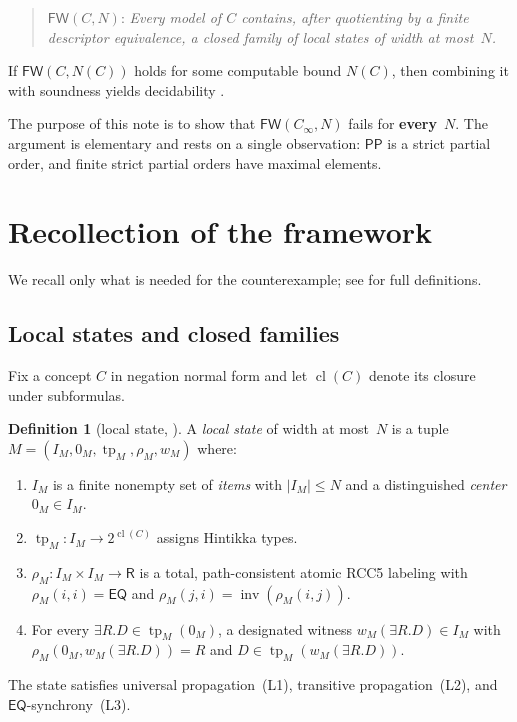 \documentclass[11pt]{article}
\theoremstyle{definition}
\newtheorem{definition}[theorem]{Definition}
\newcommand{\cl}{\operatorname{cl}}
\newcommand{\tp}{\operatorname{tp}}
\newcommand{\Roles}{\mathsf{R}}
\newcommand{\Eq}{\mathsf{EQ}}
\newcommand{\Pp}{\mathsf{PP}}
\newcommand{\inv}{\operatorname{inv}}
\begin{document}
\begin{quote}
$\mathsf{FW}(C,N)$: \emph{Every model of $C$ contains, after
quotienting by a finite descriptor equivalence, a closed family of
local states of width at most~$N$.}
\end{quote}

If $\mathsf{FW}(C,N(C))$ holds for some computable bound $N(C)$, then
combining it with soundness yields decidability \cite[Proposition~7.1]{GPT2026}.

\medskip
The purpose of this note is to show that $\mathsf{FW}(C_\infty,N)$
fails for \textbf{every}~$N$.  The argument is elementary and rests on
a single observation: $\Pp$ is a strict partial order, and finite
strict partial orders have maximal elements.

\section{Recollection of the framework}\label{sec:recap}

We recall only what is needed for the counterexample; see
\cite{GPT2026} for full definitions.

\subsection{Local states and closed families}

Fix a concept $C$ in negation normal form and let
$\cl(C)$ denote its closure under subformulas.

\begin{definition}[local state, ]
A \emph{local state} of width at most~$N$ is a tuple
$M=(I_M,0_M,\tp_M,\rho_M,w_M)$ where:
\begin{enumerate}[label=(\alph*)]
\item $I_M$ is a finite nonempty set of \emph{items} with
  $|I_M|\le N$ and a distinguished \emph{center} $0_M\in I_M$.
\item $\tp_M:I_M\to 2^{\cl(C)}$ assigns Hintikka types.
\item $\rho_M:I_M\times I_M\to\Roles$ is a total, path-consistent
  atomic RCC5 labeling with $\rho_M(i,i)=\Eq$ and
  $\rho_M(j,i)=\inv(\rho_M(i,j))$.
\item For every $\exists R.D\in\tp_M(0_M)$, a designated witness
  $w_M(\exists R.D)\in I_M$ with
  $\rho_M(0_M,w_M(\exists R.D))=R$ and $D\in\tp_M(w_M(\exists R.D))$.
\end{enumerate}
The state satisfies universal propagation~(L1), transitive
propagation~(L2), and $\Eq$-synchrony~(L3).
\end{definition}
\end{document}
